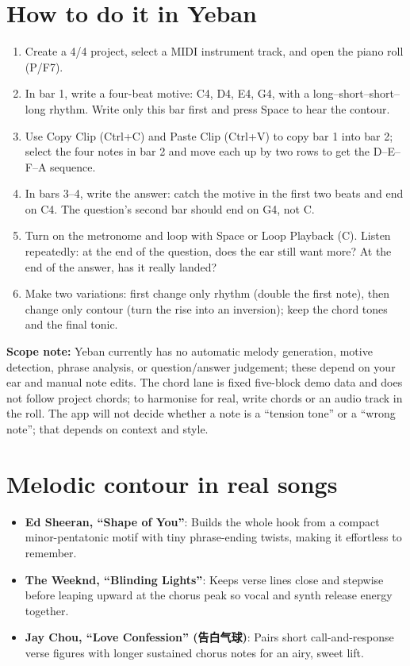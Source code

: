 \section{How to do it in Yeban}

\begin{enumerate}
  \item Create a 4/4 project, select a MIDI instrument track, and open the piano roll (P/F7).
  \item In bar 1, write a four-beat motive: C4, D4, E4, G4, with a long--short--short--long rhythm. Write only this bar first and press Space to hear the contour.
  \item Use Copy Clip (Ctrl+C) and Paste Clip (Ctrl+V) to copy bar 1 into bar 2; select the four notes in bar 2 and move each up by two rows to get the D--E--F--A sequence.
  \item In bars 3--4, write the answer: catch the motive in the first two beats and end on C4. The question's second bar should end on G4, not C.
  \item Turn on the metronome and loop with Space or Loop Playback (C). Listen repeatedly: at the end of the question, does the ear still want more? At the end of the answer, has it really landed?
  \item Make two variations: first change only rhythm (double the first note), then change only contour (turn the rise into an inversion); keep the chord tones and the final tonic.
\end{enumerate}


\textbf{Scope note:} Yeban currently has no automatic melody generation, motive detection, phrase analysis, or question/answer judgement; these depend on your ear and manual note edits. The chord lane is fixed five-block demo data and does not follow project chords; to harmonise for real, write chords or an audio track in the roll. The app will not decide whether a note is a ``tension tone'' or a ``wrong note''; that depends on context and style.

\section{Melodic contour in real songs}

\begin{itemize}
  \item \textbf{Ed Sheeran, ``Shape of You''}: Builds the whole hook from a compact minor-pentatonic motif with tiny phrase-ending twists, making it effortless to remember.
  \item \textbf{The Weeknd, ``Blinding Lights''}: Keeps verse lines close and stepwise before leaping upward at the chorus peak so vocal and synth release energy together.
  \item \textbf{Jay Chou, ``Love Confession'' (告白气球)}: Pairs short call-and-response verse figures with longer sustained chorus notes for an airy, sweet lift.
\end{itemize}

